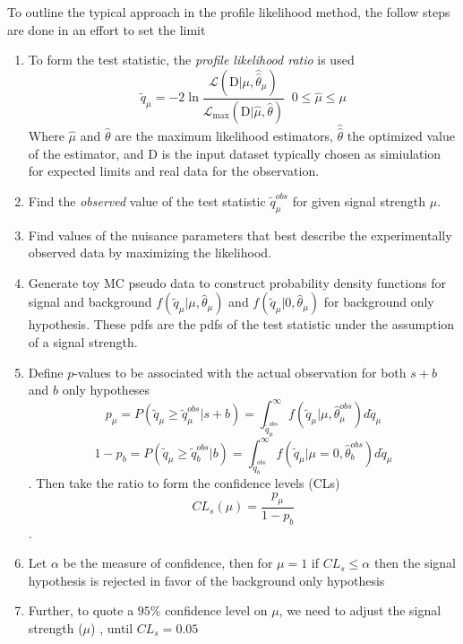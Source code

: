 To outline the typical approach in the profile likelihood method, the follow steps are done in an effort to set the limit
\begin{enumerate}
\item {To form the test statistic, the \textit{profile likelihood ratio} is used 
  \begin{equation}\tilde{q}_\mu = -2 \ln \frac{\mathcal{L}(\text{D}|\mu,\hat{\hat{\theta}}_\mu)}{\mathcal{L}_\text{max}(\text{D}|\hat{\mu},\hat{\theta})} \;\; 0\leq \hat{\mu} \leq \mu \end{equation}
  Where $\hat{\mu}$ and $\hat{\theta}$ are the maximum likelihood estimators, $\hat{\hat{\theta}}$ the optimized value of the estimator, and D is the input dataset typically chosen as simiulation for expected limits and real data for the observation.
  }
  \item Find the \textit{observed} value of the test statistic $\tilde{q}_\mu^{obs}$ for given signal strength $\mu$.
  \item Find values of the nuisance parameters that best describe the experimentally observed data by maximizing the likelihood.
  \item Generate toy MC pseudo data to construct probability density functions for signal and background $f(\tilde{q}_\mu|\mu,\hat{\theta}_\mu)$ and $f(\tilde{q}_\mu|0,\hat{\theta}_\mu)$ for background only hypothesis. These pdfs are the pdfs of the test statistic under the assumption of a signal strength.
  \item {Define $p$-values to be associated with the actual observation for both $s+b$ and $b$ only hypotheses
  \begin{equation} p_\mu = P(\tilde{q}_\mu \ge \tilde{q}_\mu^{obs}| s+b) = \int_{\tilde{q}_\mu^{obs}}^\infty f(\tilde{q}_\mu |\mu,\hat{\theta}_\mu^{obs} ) d\tilde{q}_\mu\end{equation}
  \begin{equation} 1- p_b = P(\tilde{q}_\mu \ge \tilde{q}_b^{obs}| b) = \int_{\tilde{q}_b^{obs}}^\infty f(\tilde{q}_\mu |\mu=0,\hat{\theta}_b^{obs} ) d\tilde{q}_\mu\end{equation}.
   Then take the ratio to form the confidence levels (CLs)
  \begin{equation} CL_s (\mu)  = \frac{p_\mu}{1-p_b}\end{equation}.
  }
  \item{ Let $\alpha$ be the measure of confidence, then for $\mu=1$ if $CL_s \leq \alpha$ then the signal hypothesis is rejected in favor of the background only hypothesis}
  \item {Further, to quote a $95\%$ confidence level on $\mu$, we need to adjust the signal strength ($\mu$) , until $CL_s = 0.05$}
\end{enumerate}



